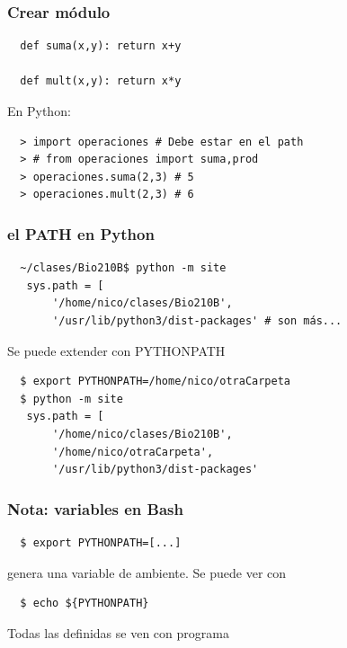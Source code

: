 \documentclass[14pt,aspectratio=169,xcolor=dvipsnames]{beamer}
\begin{document}
\begin{frame}[fragile]\frametitle{Crear módulo}
    \begin{verbatim}
  def suma(x,y): return x+y

  def mult(x,y): return x*y
    \end{verbatim}

  En Python:
  \begin{verbatim}
  > import operaciones # Debe estar en el path
  > # from operaciones import suma,prod
  > operaciones.suma(2,3) # 5
  > operaciones.mult(2,3) # 6
  \end{verbatim}
\end{frame}
\begin{frame}[fragile]\frametitle{el PATH en Python}
    \begin{verbatim}
  ~/clases/Bio210B$ python -m site
   sys.path = [
       '/home/nico/clases/Bio210B',
       '/usr/lib/python3/dist-packages' # son más...
    \end{verbatim}

    \pause Se puede extender con PYTHONPATH
    \begin{verbatim}
  $ export PYTHONPATH=/home/nico/otraCarpeta
  $ python -m site
   sys.path = [
       '/home/nico/clases/Bio210B',
       '/home/nico/otraCarpeta',
       '/usr/lib/python3/dist-packages'
    \end{verbatim}

\end{frame}
\begin{frame}[fragile]\frametitle{Nota: variables en Bash}
    \begin{verbatim}
  $ export PYTHONPATH=[...]
    \end{verbatim}
    genera una variable de ambiente. Se puede ver con
    \begin{verbatim}
  $ echo ${PYTHONPATH}
    \end{verbatim}
  Todas las definidas se ven con programa 
\end{frame}
\end{document}
